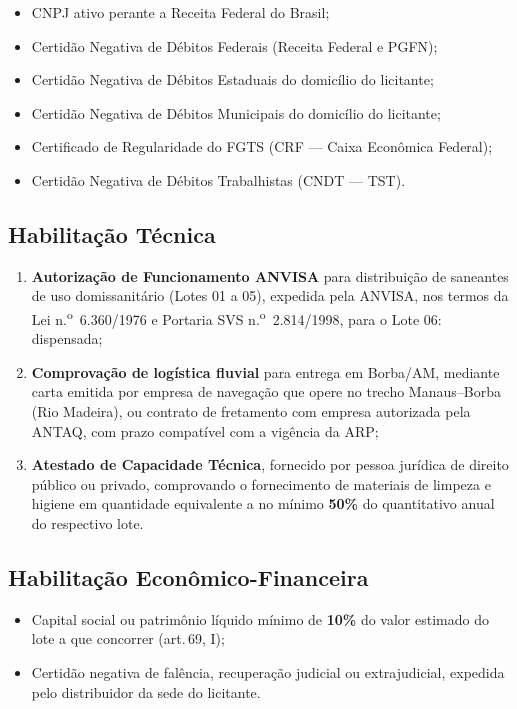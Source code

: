 \documentclass[12pt,a4paper]{article}
\newcommand{\art}[1]{art.\,#1}
\begin{document}
\begin{itemize}
  \item CNPJ ativo perante a Receita Federal do Brasil;
  \item Certidão Negativa de Débitos Federais (Receita Federal e PGFN);
  \item Certidão Negativa de Débitos Estaduais do domicílio do licitante;
  \item Certidão Negativa de Débitos Municipais do domicílio do licitante;
  \item Certificado de Regularidade do FGTS (CRF --- Caixa Econômica Federal);
  \item Certidão Negativa de Débitos Trabalhistas (CNDT --- TST).
\end{itemize}

\subsection{Habilitação Técnica}

\begin{enumerate}
  \item \textbf{Autorização de Funcionamento ANVISA} para distribuição de saneantes
    de uso domissanitário (Lotes 01 a 05), expedida pela ANVISA, nos termos da Lei
    n.\textsuperscript{o}~6.360/1976 e Portaria SVS n.\textsuperscript{o}~2.814/1998,
    para o Lote 06: dispensada;

  \item \textbf{Comprovação de logística fluvial} para entrega em Borba/AM,
    mediante carta emitida por empresa de navegação que opere no trecho
    Manaus--Borba (Rio Madeira), ou contrato de fretamento com empresa autorizada
    pela ANTAQ, com prazo compatível com a vigência da ARP;

  \item \textbf{Atestado de Capacidade Técnica}, fornecido por pessoa jurídica de
    direito público ou privado, comprovando o fornecimento de materiais de limpeza
    e higiene em quantidade equivalente a no mínimo \textbf{50\%} do quantitativo
    anual do respectivo lote.
\end{enumerate}

\subsection{Habilitação Econômico-Financeira}

\begin{itemize}
  \item Capital social ou patrimônio líquido mínimo de \textbf{10\%} do valor
    estimado do lote a que concorrer (\art{69}, I);
  \item Certidão negativa de falência, recuperação judicial ou extrajudicial,
    expedida pelo distribuidor da sede do licitante.
\end{itemize}
\end{document}
